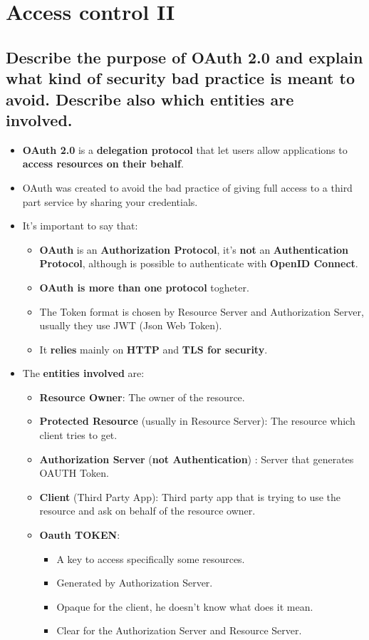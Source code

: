 \documentclass[9pt, letterpaper]{article}
\begin{document}
\newpage

\section{Access control II}

\subsection{Describe the purpose of OAuth 2.0 and explain what kind of security bad practice is meant to avoid. Describe also which entities are involved.}
\begin{itemize}
	\item \textbf{OAuth 2.0} is a \textbf{delegation protocol} that let users allow applications to \textbf{access resources on their behalf}.
	\item OAuth was created to avoid the bad practice of giving full access to a third part service by sharing your credentials.
	\item It's important to say that:
	\begin{itemize}
		\item \textbf{OAuth} is an \textbf{Authorization Protocol}, it's \textbf{not} an \textbf{Authentication Protocol}, although is possible to authenticate with \textbf{OpenID Connect}.
		\item \textbf{OAuth is more than one protocol} togheter.
		\item The Token format is chosen by Resource Server and Authorization Server, usually they use JWT (Json Web Token).
		\item It \textbf{relies} mainly on \textbf{HTTP} and \textbf{TLS for security}.
	\end{itemize}
	\item The \textbf{entities involved} are:
	\begin{itemize}
		\item \textbf{Resource Owner}: The owner of the resource.
		\item \textbf{Protected Resource} (usually in Resource Server): The resource which client tries to get.
		\item \textbf{Authorization Server} (\textbf{not Authentication}) : Server that generates OAUTH Token.
		\item \textbf{Client} (Third Party App): Third party app that is trying to use the resource and ask on behalf of the resource owner.
		\item \textbf{Oauth TOKEN}:
		\begin{itemize}
			\item A key to access specifically some resources.
			\item Generated by Authorization Server.
			\item Opaque for the client, he doesn't know what does it mean.
			\item Clear for the Authorization Server and Resource Server.
		\end{itemize}
	\end{itemize}
\end{itemize}
\end{document}
